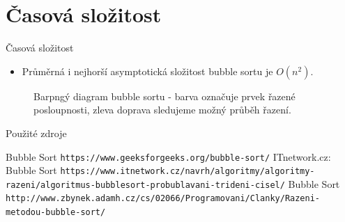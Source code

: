 \documentclass[10pt, hyperref={unicode}]{beamer}
\begin{document}
\section{Časová složitost}
\begin{frame}{Časová složitost}

			\begin{itemize}
				\item Průměrná i nejhorší asymptotická složitost bubble sortu je $O(n^2)$. 
			\end{itemize}
			
			\begin{figure}[h]
                 \centering
               \caption{Barpngý diagram bubble sortu - barva označuje prvek řazené posloupnosti, zleva doprava sledujeme možný průběh řazení.}
\end{figure}

\end{frame}



\begin{frame}{Použité zdroje}
	\begin{thebibliography}{10}
		 Bubble Sort
		\newblock \texttt{https://www.geeksforgeeks.org/bubble-sort/}
		 ITnetwork.cz: Bubble Sort
		\newblock \texttt{https://www.itnetwork.cz/navrh/algoritmy/algoritmy-razeni/algoritmus-bubblesort-probublavani-trideni-cisel/}
		 Bubble Sort
		\newblock \texttt{http://www.zbynek.adamh.cz/cs/02066/Programovani/Clanky/Razeni-metodou-bubble-sort/}
	\end{thebibliography}
\end{frame}
\end{document}
